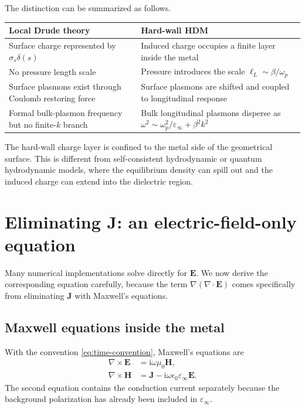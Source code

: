 \documentclass[11pt,a4paper]{article}
\newcommand{\E}{\mathbf E}
\newcommand{\Hfield}{\mathbf H}
\newcommand{\J}{\mathbf J}
\newcommand{\ii}{\mathrm i}
\newcommand{\epsinf}{\varepsilon_\infty}
\newcommand{\omegap}{\omega_p}
\begin{document}
The distinction can be summarized as follows.
\begin{center}
\begin{tabular}{>{\raggedright\arraybackslash}p{}
                >{\raggedright\arraybackslash}p{}}
\toprule
\textbf{Local Drude theory} & \textbf{Hard-wall HDM}\\
\midrule
Surface charge represented by \(\sigma_s\delta(s)\) &
Induced charge occupies a finite layer inside the metal\\
No pressure length scale &
Pressure introduces the scale \(\ell_L\sim\beta/\omegap\)\\
Surface plasmons exist through Coulomb restoring force &
Surface plasmons are shifted and coupled to longitudinal response\\
Formal bulk-plasmon frequency but no finite-\(k\) branch &
Bulk longitudinal plasmons disperse as \(\omega^2\sim\omegap^2/\epsinf+\beta^2k^2\)\\
\bottomrule
\end{tabular}
\end{center}

The hard-wall charge layer is confined to the metal side of the geometrical
surface.  This is different from self-consistent hydrodynamic or quantum
hydrodynamic models, where the equilibrium density can spill out and the
induced charge can extend into the dielectric region.

\section{Eliminating \texorpdfstring{$\J$}{J}: an electric-field-only equation}

Many numerical implementations solve directly for \(\E\).  We now derive the
corresponding equation carefully, because the term
\(\nabla(\nabla\!\cdot\!\E)\) comes specifically from eliminating \(\J\) with
Maxwell's equations.

\subsection{Maxwell equations inside the metal}

With the convention \eqref{eq:time-convention}, Maxwell's equations are
\begin{align}
    \nabla\!\times\!\E&=\ii\omega\mu_0\Hfield,
    \label{eq:faraday-frequency}\\
    \nabla\!\times\!\Hfield
    &=\J-\ii\omega\epsilon_0\epsinf\E.
    \label{eq:ampere-frequency}
\end{align}
The second equation contains the conduction current separately because the
background polarization has already been included in \(\epsinf\).
\end{document}
